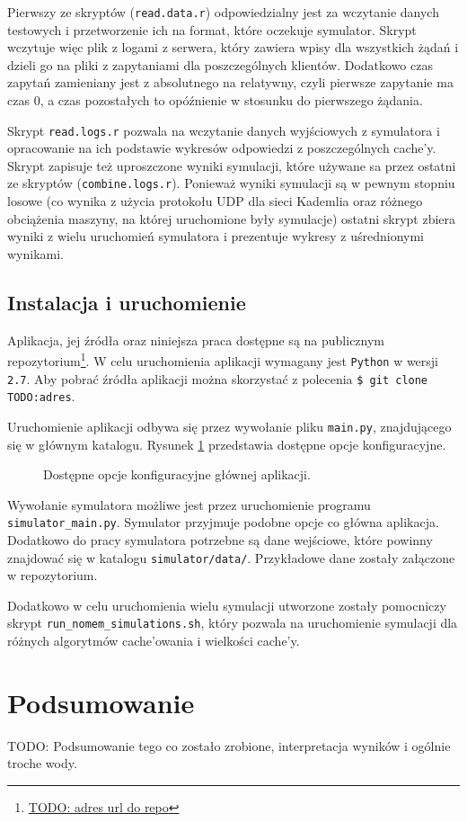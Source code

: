 \documentclass[a4paper,11pt]{scrartcl}
\newcommand{\f}{\texttt}
\newcommand{\s}{ }
\newcommand{\keszy}{cache'y}
\newcommand{\keszowania}{cache'owania}
\begin{document}
Pierwszy ze skryptów (\f{read.data.r}) odpowiedzialny jest za wczytanie danych testowych i przetworzenie ich na format, które oczekuje symulator. Skrypt wczytuje więc plik z logami z serwera, który zawiera wpisy dla wszystkich żądań i dzieli go na pliki z zapytaniami dla poszczególnych klientów. Dodatkowo czas zapytań zamieniany jest z absolutnego na relatywny, czyli pierwsze zapytanie ma czas $0$, a czas pozostałych to opóźnienie w stosunku do pierwszego żądania.

Skrypt \f{read.logs.r} pozwala na wczytanie danych wyjściowych z symulatora i opracowanie na ich podstawie wykresów odpowiedzi z poszczególnych \keszy. Skrypt zapisuje też uproszczone wyniki symulacji, które używane sa przez ostatni ze skryptów (\f{combine.logs.r}). Ponieważ wyniki symulacji są w pewnym stopniu losowe (co wynika z użycia protokołu UDP dla sieci Kademlia oraz różnego obciążenia maszyny, na której uruchomione były symulacje) ostatni skrypt zbiera wyniki z wielu uruchomień symulatora i prezentuje wykresy z uśrednionymi wynikami.

\subsection{Instalacja i uruchomienie}
\label{sect_impl_install}
Aplikacja, jej źródła oraz niniejsza praca dostępne są na publicznym repozytorium\footnote{\url{TODO: adres url do repo}}. W celu uruchomienia aplikacji wymagany jest \f{Python} w wersji \f{2.7}. Aby pobrać źródła aplikacji można skorzystać z polecenia \f{\$ git clone TODO:adres}.

Uruchomienie aplikacji odbywa się przez wywołanie pliku \f{main.py}, znajdującego się w głównym katalogu. Rysunek \ref{fig_main_help} przedstawia dostępne opcje konfiguracyjne.

\begin{figure}[h]
\caption{Dostępne opcje konfiguracyjne głównej aplikacji.}
\label{fig_main_help}
\end{figure}

Wywołanie symulatora możliwe jest przez uruchomienie programu \f{simulator\_main.py}. Symulator przyjmuje podobne opcje co główna aplikacja. Dodatkowo do pracy symulatora potrzebne są dane wejściowe, które powinny znajdować się w katalogu \f{simulator/data/}. Przykładowe dane zostały załączone w repozytorium.

Dodatkowo w celu uruchomienia wielu symulacji utworzone zostały pomocniczy skrypt \f{run\_nomem\_simulations.sh}, który pozwala na uruchomienie symulacji dla różnych algorytmów \keszowania\s i wielkości \keszy.


\section{Podsumowanie}

TODO: Podsumowanie tego co zostało zrobione, interpretacja wyników i ogólnie troche wody.




\end{document}
